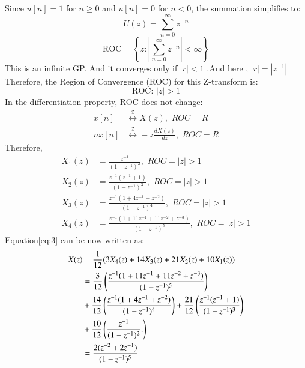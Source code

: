 \documentclass[journal,12pt,twocolumn]{IEEEtran}
\theoremstyle{remark}
\begin{document}
\begin{enumerate}[label=\alph*)]
Since \(u[n] = 1\) for \(n \geq 0\) and \(u[n] = 0\) for \(n < 0\), the summation simplifies to:
\begin{equation}\label{eq:z_transform_simplified}
    U(z) = \sum_{n=0}^{\infty} z^{-n}
\end{equation}
\begin{equation}
    \text{ROC} = \left\{ z : \left| \sum_{n=0}^{\infty} z^{-n} \right| < \infty \right\}
\end{equation}
This is an infinite GP. And it converges only if $|r|<1$ .And here , $|r|=|z^{-1}|$ Therefore,
the Region of Convergence (ROC) for this Z-transform is:
\begin{equation}\label{eq:roc}
    \text{ROC: } |z| > 1
\end{equation}
In the differentiation property, ROC does not change:\\
\begin{align}
x[n] &\stackrel{\mathcal{Z}}{\longleftrightarrow} X(z),\hspace{4pt} ROC = R\\
n x[n] &\stackrel{\mathcal{Z}}{\longleftrightarrow} -z \frac{dX(z)}{dz},\hspace{4pt} ROC = R 
\end{align}
Therefore,
\begin{align}
    X_1(z) &= \frac{z^{-1}}{(1-z^{-1})^2} , \hspace{4pt} ROC=|z|>1\\
    X_2(z) &= \frac{z^{-1}(z^{-1}+1)}{(1-z^{-1})^3} , \hspace{4pt} ROC=|z|>1\\
    X_3(z) &= \frac{z^{-1}(1+4z^{-1}+z^{-2})}{(1-z^{-1})^4}, \hspace{4pt} ROC=|z|>1\\
    X_4(z) &= \frac{z^{-1}(1+11z^{-1}+11z^{-2}+z^{-3})}{(1-z^{-1})^5}, \hspace{4pt} ROC=|z|>1
\end{align}
Equation\eqref{eq:3} can be now written as:
\begin{align}
    X(z) &=\frac{1}{12}(3X_4(z) + 14X_3(z) + 21X_2(z) + 10X_1(z)) \\
         &= \frac{3}{12}\left(\frac{z^{-1}(1+11z^{-1}+11z^{-2}+z^{-3})}{(1-z^{-1})^5}\right)\\ &+ \frac{14}{12}\left(\frac{z^{-1}(1+4z^{-1}+z^{-2})}{(1-z^{-1})^4}\right) 
         + \frac{21}{12}\left(\frac{z^{-1}(z^{-1}+1)}{(1-z^{-1})^3}\right)\notag \\ &+ \frac{10}{12}\left(\frac{z^{-1}}{(1-z^{-1})^2}.\right)\notag \\
         &= \frac{2(z^{-2}+2z^{-1})}{(1-z^{-1})^5}
\end{align}


\end{enumerate}
\end{document}
